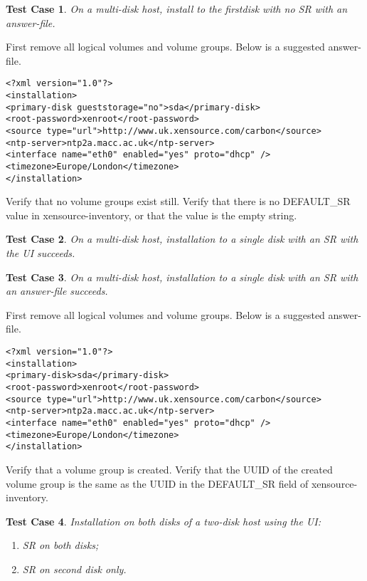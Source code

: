 \documentclass[a4paper]{article}
\newtheorem{testcase}{Test Case}
\begin{document}
\begin{testcase}
On a multi-disk host, install to the firstdisk with no SR with an
answer-file.
\end{testcase}

First remove all logical volumes and volume groups.  Below is a
suggested answer-file.

\begin{verbatim}
<?xml version="1.0"?>
<installation>
<primary-disk gueststorage="no">sda</primary-disk>
<root-password>xenroot</root-password>
<source type="url">http://www.uk.xensource.com/carbon</source>
<ntp-server>ntp2a.macc.ac.uk</ntp-server>
<interface name="eth0" enabled="yes" proto="dhcp" />
<timezone>Europe/London</timezone>
</installation>
\end{verbatim}

Verify that no volume groups exist still.  Verify that there is no
DEFAULT\_SR value in xensource-inventory, or that the value is the
empty string.

\begin{testcase}
On a multi-disk host, installation to a single disk with an SR with
the UI succeeds.
\end{testcase}

\begin{testcase}
On a multi-disk host, installation to a single disk with an SR with an
answer-file succeeds.
\end{testcase}

First remove all logical volumes and volume groups.  Below is a
suggested answer-file.

\begin{verbatim}
<?xml version="1.0"?>
<installation>
<primary-disk>sda</primary-disk>
<root-password>xenroot</root-password>
<source type="url">http://www.uk.xensource.com/carbon</source>
<ntp-server>ntp2a.macc.ac.uk</ntp-server>
<interface name="eth0" enabled="yes" proto="dhcp" />
<timezone>Europe/London</timezone>
</installation>
\end{verbatim}

Verify that a volume group is created.  Verify that the UUID of the
created volume group is the same as the UUID in the DEFAULT\_SR field
of xensource-inventory.

\begin{testcase}
Installation on both disks of a two-disk host using the UI:
\begin{enumerate}
\item SR on both disks;
\item SR on second disk only.
\end{enumerate}
\end{testcase}
\end{document}
